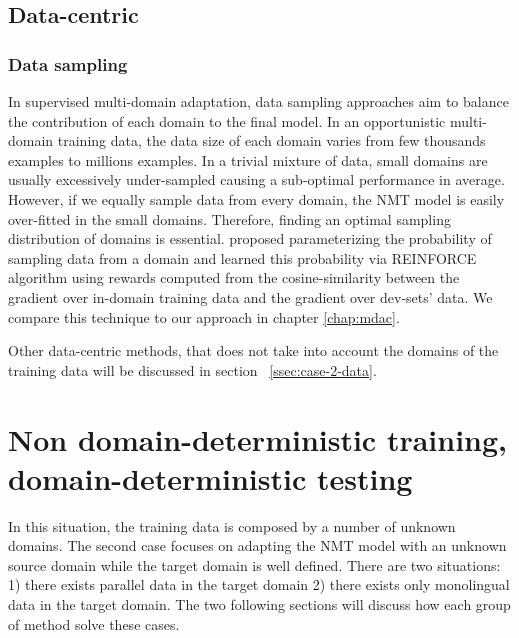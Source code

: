 \subsection{Data-centric}
\subsubsection{Data sampling}
In supervised multi-domain adaptation, data sampling approaches aim to balance the contribution of each domain to the final model. In an opportunistic multi-domain training data, the data size of each domain varies from few thousands examples to millions examples. In a trivial mixture of data, small domains are usually excessively under-sampled causing a sub-optimal performance in average. However, if we equally sample data from every domain, the NMT model is easily over-fitted in the small domains. Therefore, finding an optimal sampling distribution of domains is essential. \citet{Wang20balancing} proposed parameterizing the probability of sampling data from a domain and learned this probability via REINFORCE algorithm \citet{Williams92simple} using rewards computed from the cosine-similarity between the gradient over in-domain training data and the gradient over dev-sets' data. We compare this technique to our approach in chapter \ref{chap:mdac}.

Other data-centric methods, that does not take into account the domains of the training data will be discussed in section ~\ref{ssec:case-2-data}.
\section{Non domain-deterministic training, domain-deterministic testing}
\label{sec:case2}
In this situation, the training data is composed by a number of unknown domains. The second case focuses on adapting the NMT model with an unknown source domain while the target domain is well defined. There are two situations: 1) there exists parallel data in the target domain 2) there exists only monolingual data in the target domain. The two following sections will discuss how each group of method solve these cases.
